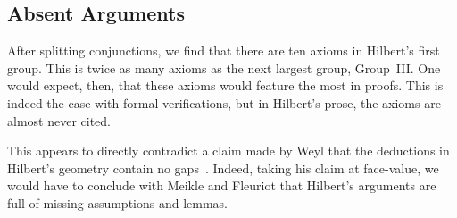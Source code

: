 
\subsection{Absent Arguments}
After splitting conjunctions, we find that there are ten axioms in Hilbert's first group. This is twice as many axioms as the next largest group, Group~III. One would expect, then, that these axioms would feature the most in proofs. This is indeed the case with formal verifications, but in Hilbert's prose, the axioms are almost never cited.

This appears to directly contradict a claim made by Weyl that the deductions in Hilbert's geometry contain no gaps~\cite{WeylNoGaps}. Indeed, taking his claim at face-value, we would have to conclude with Meikle and Fleuriot that Hilbert's arguments are full of missing assumptions and lemmas. 

